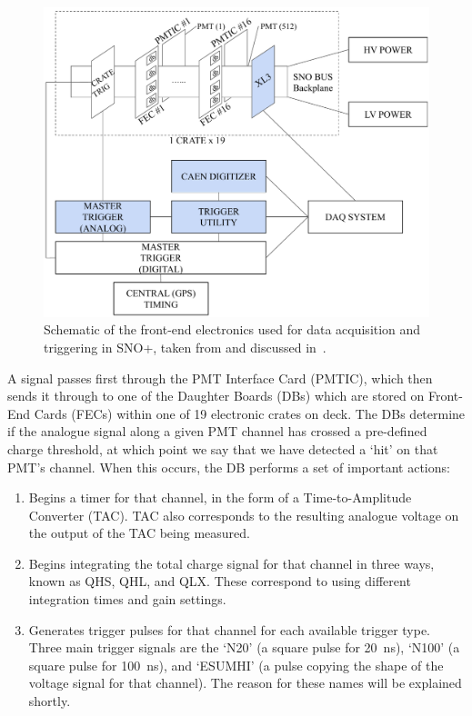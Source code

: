 \begin{figure}
    \centering
    \includegraphics[width=0.7\linewidth]{2_Detector/Figs/electronics_diagram.pdf}
    \caption[Schematic of the front-end electronics used for data acquisition and triggering in SNO+]{Schematic of the front-end electronics used for data acquisition and triggering in SNO+, taken from and discussed in~\cite{albaneseSNOExperiment2021}. %
    }
    \label{fig:tdaq_schematic}
\end{figure}

A signal passes first through the PMT Interface Card (PMTIC), which then sends it through to one of the Daughter Boards (DBs) which are stored on Front-End Cards (FECs) within one of 19 electronic crates on deck. The DBs determine if the analogue signal along a given PMT channel has crossed a pre-defined charge threshold, at which point we say that we have detected a `hit' on that PMT's channel. When this occurs, the DB performs a set of important actions:
\begin{enumerate}
    \item Begins a timer for that channel, in the form of a Time-to-Amplitude Converter (TAC). TAC also corresponds to the resulting analogue voltage on the output of the TAC being measured.
    \item Begins integrating the total charge signal for that channel in three ways, known as QHS, QHL, and QLX. These correspond to using different integration times and gain settings.
    \item Generates trigger pulses for that channel for each available trigger type. Three main trigger signals are the `N20' (a square pulse for \SI{20}{\ns}), `N100' (a square pulse for \SI{100}{\ns}), and `ESUMHI' (a pulse copying the shape of the voltage signal for that channel). The reason for these names will be explained shortly.
\end{enumerate}

